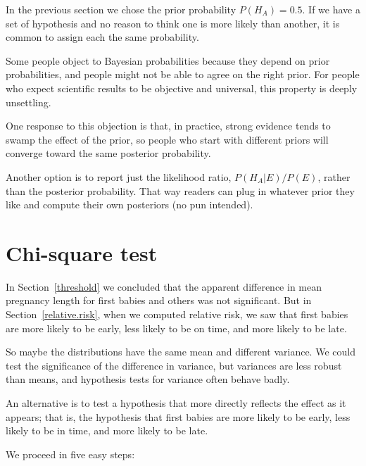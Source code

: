 \documentclass[12pt]{book}
\begin{document}
In the previous section we chose the prior probability $P(H_A) = 0.5$.
If we have a set of hypothesis and no reason to think one is more
likely than another, it is common to assign each the same probability.

Some people object to Bayesian probabilities because they depend on
prior probabilities, and people might not be able to agree on
the right prior.  For people who expect scientific results to be
objective and universal, this property is deeply unsettling.

One response to this objection is that, in practice, strong evidence
tends to swamp the effect of the prior, so people who start with
different priors will converge toward the same posterior
probability.

Another option is to report just the likelihood ratio, 
$P(H_A | E)/P(E)$, rather than the posterior probability.  That way
readers can plug in whatever prior they like and compute their own
posteriors (no pun intended).


\section{Chi-square test}

In Section~\ref{threshold} we concluded that the apparent difference
in mean pregnancy length for first babies and others was not
significant.  But in Section~\ref{relative.risk}, when we computed
relative risk, we saw that first babies are more likely to be early,
less likely to be on time, and more likely to be late.

So maybe the distributions have the same mean and different variance.
We could test the significance of the difference in variance, but
variances are less robust than means, and hypothesis tests for
variance often behave badly.

An alternative is to test a hypothesis that more directly reflects the
effect as it appears; that is, the hypothesis that first babies are
more likely to be early, less likely to be in time, and more likely to
be late.

We proceed in five easy steps:
\end{document}
